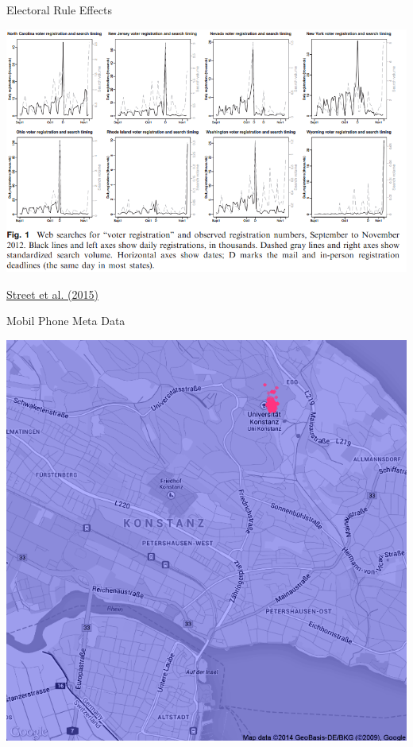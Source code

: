 \documentclass[ignorenonframetext,]{beamer}
\begin{document}
\begin{frame}{Electoral Rule Effects}

\includegraphics{fig/street.png}

\href{http://pan.oxfordjournals.org/content/early/2015/03/11/pan.mpv002.full}{Street
et al. (2015)}

\end{frame}

\begin{frame}{Mobil Phone Meta Data}

\includegraphics{fig/mobil_meta.png}

\end{frame}
\end{document}
